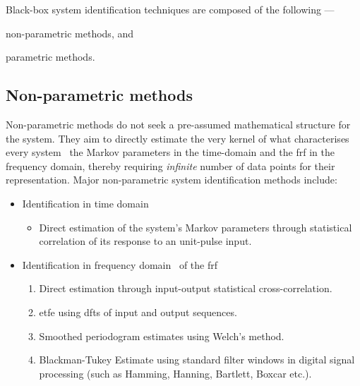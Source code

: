 
Black-box system identification techniques are composed of the following ---
\begin{enumerate*}[label=\emph{\alph*})]
     \item non-parametric methods, and
     \item parametric methods.
 \end{enumerate*}

\subsection{Non-parametric methods}
Non-parametric methods do not seek  a pre-assumed mathematical structure for the
system. They  aim to  directly estimate  the very  kernel of  what characterises
every system \viz~the Markov parameters in the time-domain  and the \gls{frf}
in the frequency domain, thereby requiring \emph{infinite} number of data points
for  their representation.  Major non-parametric  system identification  methods
include:
\begin{itemize}[topsep=0pt]
    \item Identification in time domain
        \begin{itemize}

            \item Direct  estimation of the system's  Markov parameters through
                statistical correlation of its response to an unit-pulse input.

        \end{itemize}
    \item Identification in frequency domain \ie~of the \gls{frf}
        \begin{enumerate}

            \item   Direct   estimation    through   input-output   statistical
                cross-correlation.

            \item  \gls{etfe} using \glspl{dft} of input and output sequences.

            \item  Smoothed periodogram estimates using Welch's method.

            \item  Blackman-Tukey  Estimate   using  standard  filter
                windows  in digital  signal processing  (such as  Hamming, Hanning,
                Bartlett, Boxcar etc.).

        \end{enumerate}
\end{itemize}

